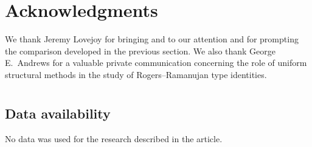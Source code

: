 \documentclass[11pt]{amsart}
\theoremstyle{definition}
\theoremstyle{remark}
\numberwithin{equation}{section}
\begin{document}
\section*{Acknowledgments}
We thank Jeremy Lovejoy for bringing \cite{overpartitions} and \cite{JoichiStanton1987} to our attention and for prompting the comparison developed in the previous section. We also thank George E.~Andrews for a valuable private communication concerning the role of uniform structural methods in the study of Rogers--Ramanujan type identities.

\section*{}
\subsection*{Data availability}
No data was used for the research described in the article.
\end{document}
